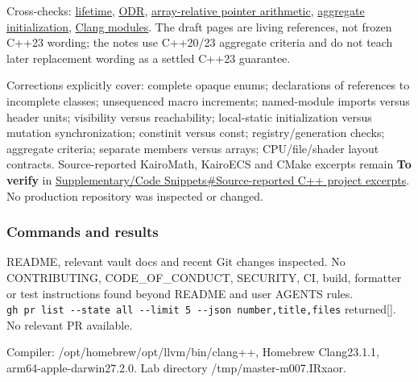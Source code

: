 Cross-checks: \href{https://eel.is/c++draft/basic.life}{lifetime}, \href{https://eel.is/c++draft/basic.def.odr}{ODR}, \href{https://eel.is/c++draft/expr.add}{array-relative pointer arithmetic}, \href{https://eel.is/c++draft/dcl.init.aggr}{aggregate initialization}, \href{https://clang.llvm.org/docs/StandardCPlusPlusModules.html}{Clang modules}. The draft pages are living references, not frozen C++23 wording; the notes use C++20/23 aggregate criteria and do not teach later replacement wording as a settled C++23 guarantee.

Corrections explicitly cover: complete opaque enums; declarations of references to incomplete classes; unsequenced macro increments; named-module imports versus header units; visibility versus reachability; local-static initialization versus mutation synchronization; constinit versus const; registry/generation checks; aggregate criteria; separate members versus arrays; CPU/file/shader layout contracts. Source-reported KairoMath, KairoECS and CMake excerpts remain \textbf{To verify} in \hyperref[appendix-4e2236f53445-source-reported-c-project-excerpts]{Supplementary/Code Snippets\#Source-reported C++ project excerpts}. No production repository was inspected or changed.

\subsubsection{Commands and results}\label{appendix-a103e7846d21-commands-and-results}

README, relevant vault docs and recent Git changes inspected. No CONTRIBUTING, CODE\_OF\_CONDUCT, SECURITY, CI, build, formatter or test instructions found beyond README and user AGENTS rules. \texttt{gh\ pr\ list\ -\/-state\ all\ -\/-limit\ 5\ -\/-json\ number,title,files} returned{[}{]}. No relevant PR available.

Compiler: /opt/homebrew/opt/llvm/bin/clang++, Homebrew Clang23.1.1, arm64-apple-darwin27.2.0. Lab directory /tmp/master-m007.IRxaor.


